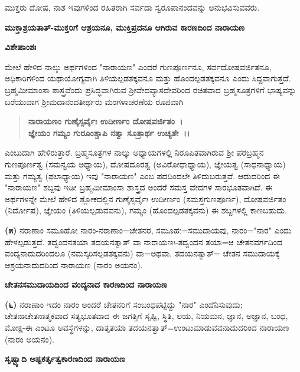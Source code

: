 ಮುಕ್ತರು ದೋಷ, ನಾಶ ಇವುಗಳಿಂದ ರಹಿತರಾಗಿ ಸರ್ವದಾ ಸ್ವರೂಪಾನಂದವನ್ನು ಅನುಭವಿಸುವವರು.

\begin{center}
\textbf{ಮುಕ್ತಾಶ್ರಯತಾತ್-ಮುಕ್ತರಿಗೆ ಆಶ್ರಯನೂ, ಮುಕ್ತಿಪ್ರದನೂ ಆಗಿರುವ ಕಾರಣದಿಂದ ನಾರಾಯಣ}
\end{center}

\noindent
\textbf{ವಿಶೇಷಾಂಶಃ\enginline{-}}

ಮೇಲೆ ಹೇಳಿದ ನಾಲ್ಕು ಅರ್ಥಗಳಿಂದ "ನಾರಾಯಣ" ಎಂದರೆ ಗುಣಪೂರ್ಣನೂ, ಸರ್ವದೋಷವರ್ಜಿತನೂ, ಅಧಿಕಾರಿಗಳಿಂದ ಯಥಾಯೋಗ್ಯವಾಗಿ ತಿಳಿಯಲ್ಪಡತಕ್ಕವನೂ ಮತ್ತು ಹೊಂದಲ್ಪಡತಕ್ಕವನೂ ಎಂದು ಸಿದ್ದವಾಗುತ್ತದೆ. ಬ್ರಹ್ಮಮೀಮಾಂಸಾ ಶಾಸ್ತ್ರವೆಂದು ಪ್ರಸಿದ್ಧವಾಗಿರುವ ಶ‍್ರೀವೇದವ್ಯಾಸದೇವರಿಂದ ರಚಿತವಾದ ಬ್ರಹ್ಮಸೂತ್ರಗಳಿಗೆ ಭಾಷ್ಯವನ್ನು ಬರೆಯುವಾಗ ಶ‍್ರೀಮದಾನಂದತೀರ್ಥರು ಮಂಗಳಾಚರಣೆಯ ರೂಪವಾಗಿ

\begin{verse}
\textbf{ನಾರಾಯಣಂ ಗುಣೈಸ್ಸರ್ವೈಃ ಉದೀರ್ಣಂ ದೋಷವರ್ಜಿತಂ~।}\\\textbf{ಜ್ಞೇಯಂ ಗಮ್ಯಂ ಗುರೂಂಶ್ಚಾಪಿ ನತ್ವಾ ಸೂತ್ರಾರ್ಥ ಉಚ್ಯತೇ~।।}
\end{verse}

\noindent
ಎಂಬುದಾಗಿ ಹೇಳಿರುತ್ತಾರೆ. ಬ್ರಹ್ಮಸೂತ್ರಗಳ ನಾಲ್ಕು ಅಧ್ಯಾಯಗಳಲ್ಲಿ ನಿರೂಪಿತವಾಗಿರುವ ಶ‍್ರೀ ಪರಬ್ರಹ್ಮನ ಗುಣಪೂರ್ಣತ್ವ (ಸಮನ್ವಯ ಅಧ್ಯಾಯ), ದೋಷದೂರತ್ವ (ಅವಿರೋಧಾಧ್ಯಾಯ), ಜ್ಞೇಯತ್ವ (ಸಾಧನಾಧ್ಯಾಯ) ಮತ್ತು ಗಮ್ಯತ್ವ (ಫಲಾಧ್ಯಾಯ) ಇವು "ನಾರಾಯಣ" ಎಂಬ ಪದದಿಂದಲೇ ತಿಳಿದುಬರುತ್ತವೆ. ಆದುದರಿಂದ ಈ "ನಾರಾಯಣ" ಶಬ್ದವು ಇಡೀ ಬ್ರಹ್ಮಮೀಮಾಂಸಾ ಶಾಸ್ತ್ರದ ಅಂದರೆ ಸಮಸ್ತ ವೇದಗಳ ಸಾರಭೂತವಾಗಿದೆ. ಈ ಅರ್ಥಗಳನ್ನೇ ಮೇಲೆ ಹೇಳಿದ ಶ್ಲೋಕದಲ್ಲಿನ ಗುಣೈಸ್ಸರ್ವೈಃ ಉದೀರ್ಣಂ (ಸಮಸ್ತಗುಣಪೂರ್ಣ), ದೋಷವರ್ಜಿತಂ (ನಿರ್ದೋಷ), ಜ್ಞೇಯಂ (ತಿಳಿಯಲ್ಪಡುವವನು), ಗಮ್ಯಂ (ಹೊಂದಲ್ಪಡತಕ್ಕವನು) ಈ ಶಬ್ದಗಳಲ್ಲಿ ಕಾಣಬಹುದು.

\textbf{(೫)} ನರಾಣಾಂ ಸಮೂಹೋ ನಾರಂ-ನರಾಣಾಂ=ಚೇತನರ, ಸಮೂಹಃ=ಸಮುದಾ\-ಯವು, ನಾರಂ="ನಾರ" ಎಂದು ಹೇಳಲ್ಪಡುತ್ತದೆ. ತದ್ವಂದನತಯಾ ತದಯನತ್ವಾತ್ ವಾ ನಾರಾಯಣಃ-ತದ್ವಂದನ ತಯಾ=ಆ ಚೇತನವರ್ಗದಿಂದ ವಂದ್ಯನಾದುದರಿಂದಲೂ (ನಮಸ್ಕರಿಸಲ್ಪಡತಕ್ಕವನು) ವಾ=ಅಥವಾ, ತದಯನತ್ವಾತ್= ಚೇತನ ಸಮುದಾಯಕ್ಕೆ ಆಶ್ರಯನಾದುದರಿಂದ ನಾರಾಯಣ (ನಾರಂ ಅಯನಂ).

\begin{center}
\textbf{ಚೇತನಸಮುದಾಯದಿಂದ ವಂದ್ಯನಾದ ಕಾರಣದಿಂದ ನಾರಾಯಣ}
\end{center}

\textbf{(೬)} ನರಾಣಾಂ ಇದಂ ನಾರಂ ಅಂದರೆ ಚೇತನರಿಗೆ ಸಂಬಂಧಪಟ್ಟಿದ್ದು "ನಾರ" ಎಂದೆನಿಸುವುದು; ಚೇತನಾಚೇತನಾತ್ಮಕವಾದ ಸತ್ಯಭೂತವಾದ ಈ ಜಗತ್ತಿಗೆ ಸೃಷ್ಟಿ, ಸ್ಥಿತಿ, ಲಯ, ನಿಯಮನ, ಜ್ಞಾನ, ಅಜ್ಞಾನ, ಬಂಧ, ಮೋಕ್ಷ-ಈ ಎಂಟೂ ಅವಸ್ಥೆಗಳನ್ನು, ದಾತೃತಯಾ ತದಯನತ್ವಾತ್=ಉಂಟುಮಾಡುವವನಾದುದರಿಂದ ನಾರಾಯಣ (ನಾರಂ ಅಯನಂ).

\begin{center}
\textbf{ಸೃಷ್ಟ್ಯಾದಿ ಅಷ್ಟಕರ್ತೃತ್ವಕಾರಣದಿಂದ ನಾರಾಯಣ}
\end{center}

